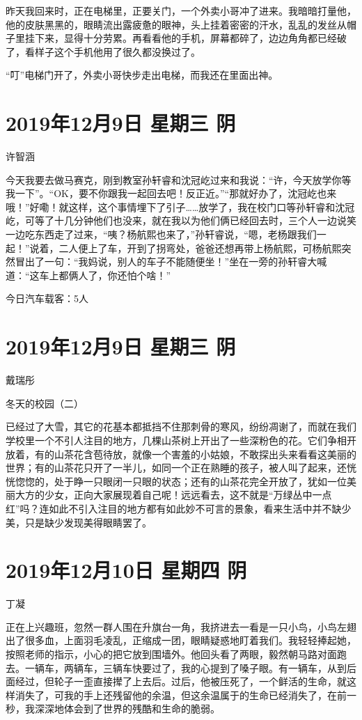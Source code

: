 昨天我回来时，正在电梯里，正要关门，一个外卖小哥冲了进来。我暗暗打量他，他的皮肤黑黑的，眼睛流出露疲惫的眼神，头上挂着密密的汗水，乱乱的发丝从帽子里挂下来，显得十分劳累。再看看他的手机，屏幕都碎了，边边角角都已经破了，看样子这个手机他用了很久都没换过了。

``叮''电梯门开了，外卖小哥快步走出电梯，而我还在里面出神。

\section{2019年12月9日 星期三 阴}

许智涵

今天我要去做马赛克，刚到教室孙轩睿和沈冠屹过来和我说：``许，今天放学你等我一下''。``OK，要不你跟我一起回去吧！反正近。''``那就好办了，沈冠屹也来哦！''好嘞！就这样，这个事情埋下了引子\ldots\ldots 放学了，我在校门口等孙轩睿和沈冠屹，可等了十几分钟他们也没来，就在我以为他们俩已经回去时，三个人一边说笑一边吃东西走了过来，``咦？杨航熙也来了，''孙轩睿说，``嗯，老杨跟我们一起！''说着，二人便上了车，开到了拐弯处，爸爸还想再带上杨航熙，可杨航熙突然冒出了一句：``我妈说，别人的车子不能随便坐！''坐在一旁的孙轩睿大喊道：``这车上都俩人了，你还怕个啥！''

今日汽车载客：5人

\section{2019年12月9日 星期三 阴}

戴瑞彤

冬天的校园（二）

已经过了大雪，其它的花基本都抵挡不住那刺骨的寒风，纷纷凋谢了，而就在我们学校里一个不引人注目的地方，几棵山茶树上开出了一些深粉色的花。它们争相开放着，有的山茶花含苞待放，就像一个害羞的小姑娘，不敢探出头来看看这美丽的世界；有的山茶花只开了一半儿，如同一个正在熟睡的孩子，被人叫了起来，还恍恍惚惚的，处于睁一只眼闭一只眼的状态；还有的山茶花完全开放了，犹如一位美丽大方的少女，正向大家展现着自己呢！远远看去，这不就是``万绿丛中一点红''吗？连如此不引入注目的地方都有如此妙不可言的景象，看来生活中并不缺少美，只是缺少发现美得眼睛罢了。

\section{2019年12月10日 星期四 阴}

丁凝

正在上兴趣班，忽然一群人围在升旗台一角，我挤进去一看是一只小鸟，小鸟左翅出了很多血，上面羽毛凌乱，正缩成一团，眼睛疑惑地盯着我们。我轻轻捧起她，按照老师的指示，小心的把它放到围墙外。他回头看了两眼，毅然朝马路对面跑去。一辆车，两辆车，三辆车快要过了，我的心提到了嗓子眼。有一辆车，从到后面经过，但轮子一歪直接撵了上去后。过后，他被压死了，一个鲜活的生命，就这样消失了，可我的手上还残留他的余温，但这余温属于的生命已经消失了，在前一秒，我深深地体会到了世界的残酷和生命的脆弱。

